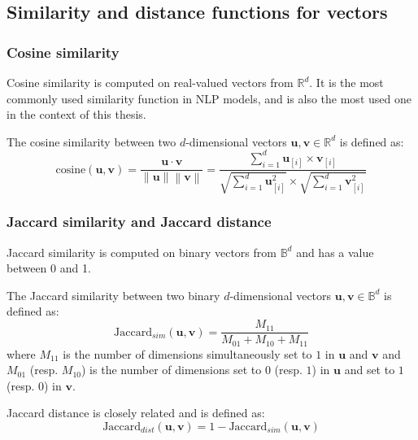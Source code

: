   \subsection{Similarity and distance functions for vectors}
    \label{ch01:subsec:similarity-distance-functions}

    \subsubsection{Cosine similarity}
      Cosine similarity is computed on real-valued vectors from $\mathbb{R}^d$.
      It is the most commonly used similarity function in NLP models, and is
      also the most used one in the context of this thesis.

      \theoremstyle{definition}
      \begin{definition}
        \label{ch01:def:def-cosine}
        The cosine similarity between two $d$-dimensional vectors $\mathbf{u},
        \mathbf{v} \in \mathbb{R}^d$ is defined as:
        \begin{equation}
          \text{cosine} (\mathbf{u}, \mathbf{v}) =
          \frac{\mathbf{u} \cdot \mathbf{v}}
          {\left\lVert \mathbf{u} \right\rVert
           \left\lVert \mathbf{v} \right\rVert} =
          \frac{\sum\limits_{i = 1}^d \mathbf{u}_{[i]} \times \mathbf{v}_{[i]}}
           {\sqrt{\sum\limits_{i = 1}^d \mathbf{u}_{[i]}^2} \times
            \sqrt{\sum\limits_{i = 1}^d \mathbf{v}_{[i]}^2}}
        \end{equation}
      \end{definition}

    \subsubsection{Jaccard similarity and Jaccard distance}
      Jaccard similarity is computed on binary vectors from $\mathbb{B}^d$ and
      has a value between 0 and 1.\\

      \theoremstyle{definition}
      \begin{definition}
        \label{ch01:def:def-jaccard}
        The Jaccard similarity between two binary $d$-dimensional vectors
        $\mathbf{u}, \mathbf{v} \in \mathbb{B}^d$ is defined as:
        \begin{equation}
          \text{Jaccard}_{sim} (\mathbf{u}, \mathbf{v}) =
          \frac{M_{11}}{M_{01} + M_{10} + M_{11}}
        \end{equation}
        where $M_{11}$ is the number of dimensions simultaneously set to $1$ in
        $\mathbf{u}$ and $\mathbf{v}$ and $M_{01}$ (resp. $M_{10}$) is the
        number of dimensions set to $0$ (resp. $1$) in $\mathbf{u}$ and set to
        $1$ (resp. $0$) in $\mathbf{v}$.

        \noindent Jaccard distance is closely related and is defined as:
        \begin{equation}
          \text{Jaccard}_{dist} (\mathbf{u}, \mathbf{v}) = 1 -
          \text{Jaccard}_{sim} (\mathbf{u}, \mathbf{v})
        \end{equation}
      \end{definition}

